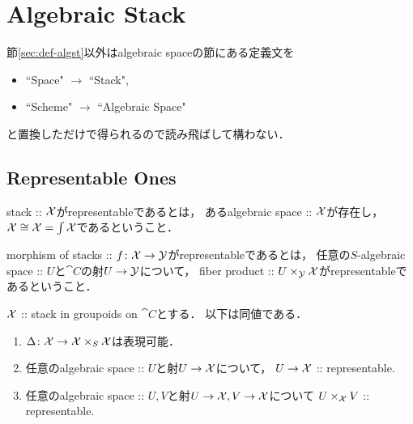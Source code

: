 \section{Algebraic Stack}
節\ref{sec:def-algst}以外はalgebraic spaceの節にある定義文を
\begin{itemize}
    \item ``Space" $\to$ ``Stack",
    \item ``Scheme" $\to$ ``Algebraic Space"
\end{itemize}
と置換しただけで得られるので読み飛ばして構わない．

\subsection{Representable Ones}
    \begin{Def}
        stack :: $\mathcal{X}$がrepresentableであるとは，
        あるalgebraic space :: $\mathcal{X}$が存在し，$\mathcal{X} \cong \mathcal{X}=\int \mathcal{X}$であるということ．
    \end{Def}

    \begin{Def}
        morphism of stacks :: $f \colon \mathcal{X} \to \mathcal{Y}$がrepresentableであるとは，
        任意の$S$-algebraic space :: $U$と$\cat{C}$の射$U \to \mathcal{Y}$について，
        fiber product :: $U \times_{\mathcal{Y}} \mathcal{X}$がrepresentableであるということ．
    \end{Def}

    \begin{Lemma}[\rep]\label{lem:repdiag_stack}
        $\mathcal{X}$ :: stack in groupoids on $\cat{C}$とする．
        以下は同値である．
        \begin{enumerate}[label=(\roman*)]
            \item
                $\Delta \colon \mathcal{X} \to \mathcal{X} \times_S \mathcal{X}$は表現可能．
            \item
                任意のalgebraic space :: $U$と射$U \to \mathcal{X}$について，
                $U \to \mathcal{X}$ :: representable.
            \item
                任意のalgebraic space :: $U, V$と射$U \to \mathcal{X}, V \to \mathcal{X}$について
                $U \times_{\mathcal{X}} V$ :: representable.
        \end{enumerate}
    \end{Lemma}

